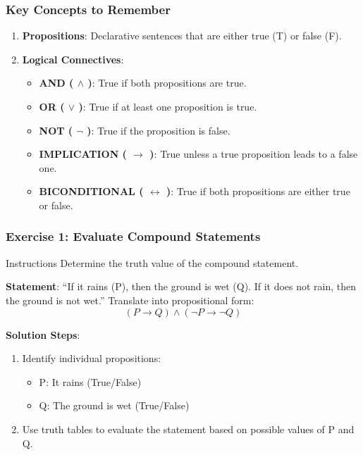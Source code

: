 \documentclass[aspectratio=169]{beamer}
\begin{document}
\begin{frame}[fragile]
    \frametitle{Key Concepts to Remember}
    \begin{enumerate}
        \item \textbf{Propositions}: Declarative sentences that are either true (T) or false (F).
        \item \textbf{Logical Connectives}:
            \begin{itemize}
                \item \textbf{AND ( $\land$ )}: True if both propositions are true.
                \item \textbf{OR ( $\lor$ )}: True if at least one proposition is true.
                \item \textbf{NOT ( $\neg$ )}: True if the proposition is false.
                \item \textbf{IMPLICATION ( $\rightarrow$ )}: True unless a true proposition leads to a false one.
                \item \textbf{BICONDITIONAL ( $\leftrightarrow$ )}: True if both propositions are either true or false.
            \end{itemize}
    \end{enumerate}
\end{frame}

\begin{frame}[fragile]
    \frametitle{Exercise 1: Evaluate Compound Statements}
    \begin{block}{Instructions}
        Determine the truth value of the compound statement.
    \end{block}
    
    \textbf{Statement}:  
    “If it rains (P), then the ground is wet (Q). If it does not rain, then the ground is not wet.”  
    Translate into propositional form:  
    \[
    (P \rightarrow Q) \land (\neg P \rightarrow \neg Q)
    \]

    \textbf{Solution Steps}:
    \begin{enumerate}
        \item Identify individual propositions:  
            \begin{itemize}
                \item P: It rains (True/False)  
                \item Q: The ground is wet (True/False)  
            \end{itemize}
        \item Use truth tables to evaluate the statement based on possible values of P and Q.
    \end{enumerate}
\end{frame}
\end{document}
